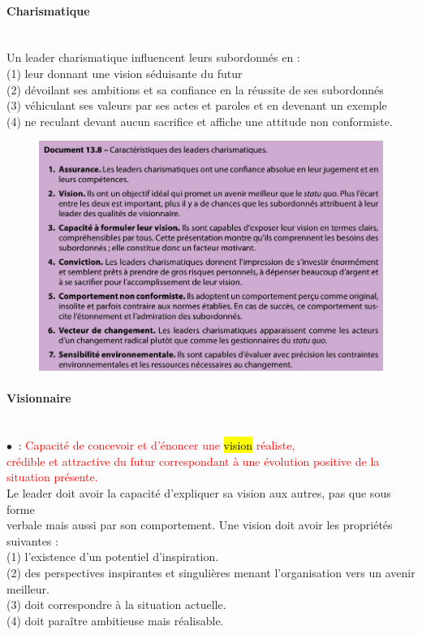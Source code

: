 \documentclass[letterpaper, 12pt]{article}
\newcommand{\myul}[1]{
	\underline{\smash{#1}}
}
\newcommand{\red}[1]{
	\textcolor{red}{#1}
}
\newcommand{\point}{$\bullet\ $}
\newcommand{\alinea}{
\hspace*{0.3cm}}
\begin{document}
			\paragraph{Charismatique}~\\
				\alinea Un leader charismatique influencent leurs subordonnés en :\\
				(1) leur donnant une vision séduisante du futur \\
				(2) dévoilant ses ambitions et sa confiance en la réussite de ses subordonnés \\
				(3) véhiculant ses valeurs par ses actes et paroles et en devenant un exemple \\
				(4) ne reculant devant aucun sacrifice et affiche une attitude non conformiste.
				\begin{figure}[H]
					\centering
					\includegraphics[scale=0.675]{Images/charismatiques}
				\end{figure}\noindent
			\paragraph{Visionnaire}~\\
				\point \myul{Leader Visionnaire} : \red{Capacité de concevoir et d'énoncer une \hl{vision}
					réaliste, \\\alinea crédible et attractive du futur correspondant à une évolution
					positive de la situation présente.} \\\alinea Le leader doit avoir la capacité 
					d'expliquer sa vision aux autres, pas que sous forme \\\alinea verbale mais aussi 
					par son	comportement. Une vision doit avoir les propriétés
					suivantes : \\
					(1) l'existence d'un potentiel d'inspiration.\\
					(2) des perspectives inspirantes et singulières menant l'organisation vers un avenir
						meilleur.\\
					(3) doit correspondre à la situation actuelle.\\
					(4) doit paraître ambitieuse mais réalisable.\\
\end{document}
